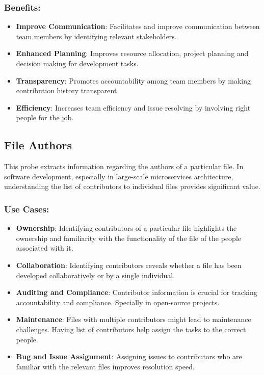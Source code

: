 \subsubsection{Benefits:}
\begin{itemize}[label=$\bullet$]
	\item \textbf{Improve Communication}: Facilitates and improve communication between team members by identifying relevant stakeholders.
	\item \textbf{Enhanced Planning}: Improves resource allocation, project planning and decision making for development tasks.
	\item \textbf{Transparency}: Promotes accountability among team members by making contribution history transparent.
	\item \textbf{Efficiency}: Increases team efficiency and issue resolving by involving right people for the job.
\end{itemize}

\subsection{File Authors}
This probe extracts information regarding the authors of a particular file. In software development, especially in large-scale microservices architecture, understanding the list of contributors to individual files provides significant value.
\subsubsection{Use Cases:}
\begin{itemize}[label=$\bullet$]
	\item \textbf{Ownership}: Identifying contributors of a particular file highlights the ownership and familiarity with the functionality of the file of the people associated with it.
	\item \textbf{Collaboration}: Identifying contributors reveals whether a file has been developed collaboratively or by a single individual.
	\item \textbf{Auditing and Compliance}: Contributor information is crucial for tracking accountability and compliance. Specially in open-source projects.
	\item \textbf{Maintenance}: Files with multiple contributors might lead to maintenance challenges. Having list of contributors help assign the tasks to the correct people.
	\item \textbf{Bug and Issue Assignment}: Assigning issues to contributors who are familiar with the relevant files improves resolution speed.
\end{itemize}
